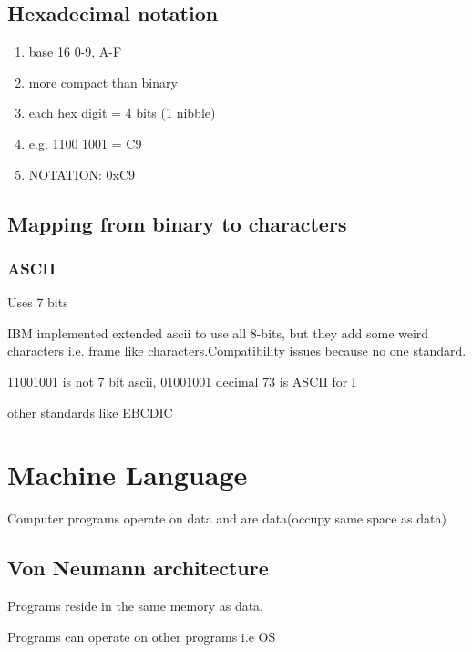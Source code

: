 \documentclass[11pt]{amsart}
\begin{document}
\subsection{Hexadecimal notation}
\begin{enumerate}
  \item base 16 0-9, A-F
  \item more compact than binary
  \item each hex digit = 4 bits (1 nibble)
  \item e.g. 1100 1001  = C9
  \item NOTATION: 0xC9
\end{enumerate}

\subsection{Mapping from binary to characters}
\subsubsection {ASCII}
\par Uses 7 bits
\par IBM implemented extended ascii to use all 8-bits, but they add some weird
characters i.e. frame like characters.Compatibility issues because no one
standard.
\par 11001001 is not 7 bit ascii, 01001001 decimal 73 is ASCII for I
\par other standards like EBCDIC
\section{Machine Language}
\par Computer programs operate on data and are data(occupy same space as data)
\subsection{Von Neumann architecture}
\par Programs reside in the same memory as data.
\par Programs can operate on other programs i.e OS
\end{document}
